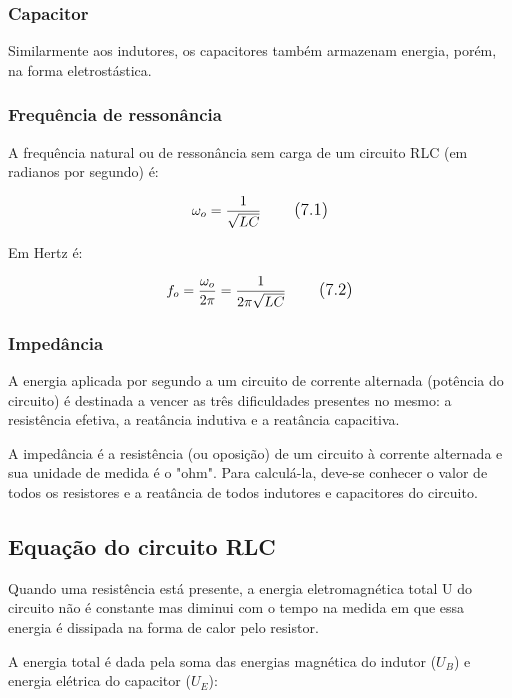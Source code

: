 \subsubsection{Capacitor}

Similarmente aos indutores, os capacitores também armazenam energia, porém, na forma eletrostástica. 

\subsubsection{Frequência de ressonância}

A frequência natural ou de ressonância sem carga de um circuito RLC (em radianos por segundo) é:

\begin{equation}
\large \omega _{o} = \frac{1}{\sqrt{LC}}
\tag{7.1}
\end{equation}

Em Hertz é:

\begin{equation}
\large f_{o} = \frac{\omega _{o}}{2\pi} = \frac{1}{2\pi\sqrt{LC}}
\tag{7.2}
\end{equation}

\subsubsection{Impedância}

A energia aplicada por segundo a um circuito de corrente alternada (potência do circuito) é destinada a vencer as três dificuldades presentes no mesmo: a resistência efetiva, a reatância indutiva e a reatância capacitiva.

A impedância é a resistência (ou oposição) de um circuito à corrente alternada e sua unidade de medida é o "ohm". Para calculá-la, deve-se conhecer o valor de todos os resistores e a reatância de todos indutores e capacitores do circuito.

\subsection{Equação do circuito RLC}

Quando uma resistência está presente, a energia eletromagnética total U do circuito não é constante mas diminui com o tempo na medida em que essa energia é dissipada na forma de calor pelo resistor.

A energia total é dada pela soma das energias magnética do indutor ($U_{B}$) e energia elétrica do capacitor ($U_{E}$):


